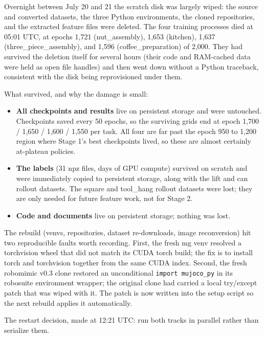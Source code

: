 \documentclass[11pt]{article}
\begin{document}
Overnight between July 20 and 21 the scratch disk was largely wiped: the
source and converted datasets, the three Python environments, the cloned
repositories, and the extracted feature files were deleted. The four training
processes died at 05:01 UTC, at epochs 1,721 (nut\_assembly), 1,653 (kitchen),
1,637 (three\_piece\_assembly), and 1,596 (coffee\_preparation) of 2,000. They
had survived the deletion itself for several hours (their code and RAM-cached
data were held as open file handles) and then went down without a Python
traceback, consistent with the disk being reprovisioned under them.

What survived, and why the damage is small:

\begin{itemize}[leftmargin=2em]
  \item \textbf{All checkpoints and results} live on persistent storage and
        were untouched. Checkpoints saved every 50 epochs, so the surviving
        grids end at epoch 1,700 / 1,650 / 1,600 / 1,550 per task. All four
        are far past the epoch 950 to 1,200 region where Stage 1's best
        checkpoints lived, so these are almost certainly at-plateau policies.
  \item \textbf{The labels} (31 npz files, days of GPU compute) survived on
        scratch and were immediately copied to persistent storage, along with
        the lift and can rollout datasets. The square and tool\_hang rollout
        datasets were lost; they are only needed for future feature work, not
        for Stage 2.
  \item \textbf{Code and documents} live on persistent storage; nothing was
        lost.
\end{itemize}

The rebuild (venvs, repositories, dataset re-downloads, image reconversion)
hit two reproducible faults worth recording. First, the fresh mg venv resolved
a torchvision wheel that did not match its CUDA torch build; the fix is to
install torch and torchvision together from the same CUDA index. Second, the
fresh robomimic v0.3 clone restored an unconditional \texttt{import mujoco\_py}
in its robosuite environment wrapper; the original clone had carried a local
try/except patch that was wiped with it. The patch is now written into the
setup script so the next rebuild applies it automatically.

The restart decision, made at 12:21 UTC: run both tracks in parallel rather
than serialize them.
\end{document}
